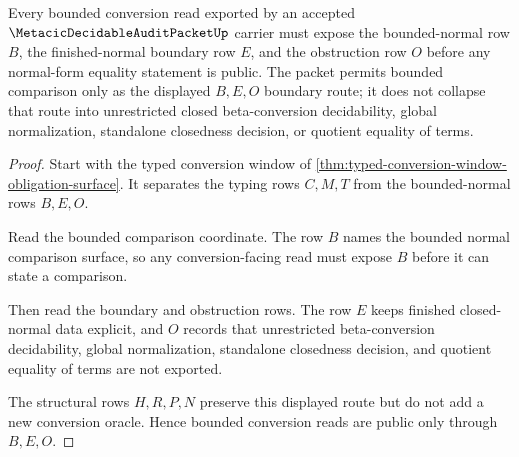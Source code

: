\begin{theorem}
\label{thm:metacic-decidable-audit-packet-bounded-normal-boundary}
Every bounded conversion read exported by an accepted $\MetacicDecidableAuditPacketUp$ carrier must expose the bounded-normal row $B$, the finished-normal boundary row $E$, and the obstruction row $O$ before any normal-form equality statement is public. The packet permits bounded comparison only as the displayed $B,E,O$ boundary route; it does not collapse that route into unrestricted closed beta-conversion decidability, global normalization, standalone closedness decision, or quotient equality of terms.
\end{theorem}
\begin{proof}
Start with the typed conversion window of \autoref{thm:typed-conversion-window-obligation-surface}. It separates the typing rows $C,M,T$ from the bounded-normal rows $B,E,O$.

Read the bounded comparison coordinate. The row $B$ names the bounded normal comparison surface, so any conversion-facing read must expose $B$ before it can state a comparison.

Then read the boundary and obstruction rows. The row $E$ keeps finished closed-normal data explicit, and $O$ records that unrestricted beta-conversion decidability, global normalization, standalone closedness decision, and quotient equality of terms are not exported.

The structural rows $H,R,P,N$ preserve this displayed route but do not add a new conversion oracle. Hence bounded conversion reads are public only through $B,E,O$.
\end{proof}

